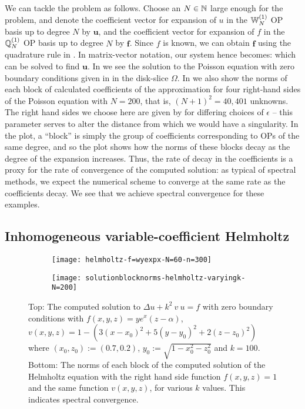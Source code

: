 We can tackle the problem as follows. Choose an $N \in \mathbb{N}$ large enough for the problem, and denote the coefficient vector for expansion of $u$ in the $\mathbb{W}_N^{(1)}$ OP basis up to degree $N$ by $\mathbf{u}$, and the coefficient vector for expansion of $f$ in the ${\mathbb{Q}}^{(1)}_{N}$ OP basis up to degree $N$ by $\mathbf{f}$. Since $f$ is known, we can obtain $\mathbf{f}$ using the quadrature rule in . In matrix-vector notation, our system hence becomes:
which can be solved to find $\mathbf{u}$.
In  we see the solution to the Poisson equation with zero boundary conditions given in  in the disk-slice $\Omega$. In  we also show the norms of each block of calculated coefficients of the approximation for four right-hand sides of the Poisson equation with $N = 200$, that is, $(N+1)^2 = 40,401$ unknowns. The right hand sides we choose here are given by
for differing choices of $\epsilon$ -- this parameter serves to alter the distance from which we would have a singularity. In the plot, a \enquote{block} is simply the group of coefficients corresponding to OPs of the same degree, and so the plot shows how the norms of these blocks decay as the degree of the expansion increases. Thus, the rate of decay in the coefficients is a proxy for the rate of convergence of the computed solution: as typical of spectral methods, we expect the numerical scheme to converge at the same rate as the coefficients decay. We see that we achieve spectral convergence for these examples.


\subsection{Inhomogeneous variable-coefficient Helmholtz}

\begin{figure}[tp]
	\centering
	\begin{subfigure}{0.85\textwidth}
		\texttt{[image: helmholtz-f=wyexpx-N=60-n=300]}
	\end{subfigure}
	
	\begin{subfigure}{0.55\textwidth}
		\texttt{[image: solutionblocknorms-helmholtz-varyingk-N=200]}
	\end{subfigure}
	\caption{Top: The computed solution to $\Delta u + k^2 \: v \: u = f$ with zero boundary conditions with $f(x,y,z) = y e^x (z - \alpha) $, $v(x,y,z) = 1 - (3(x-x_0)^2 + 5(y-y_0)^2 + 2(z-z_0)^2)$ where $(x_0, z_0) := (0.7, 0.2)$, $y_0 := \sqrt{1 - x_0^2 - z_0^2}$ and $k = 100$. Bottom: The norms of each block of the computed solution of the Helmholtz equation with the right hand side function $f(x,y,z) = 1$ and the same function $v(x,y,z)$, for various $k$ values. This indicates spectral convergence.}
	\label{fig:sc:helmholtz}
\end{figure}

